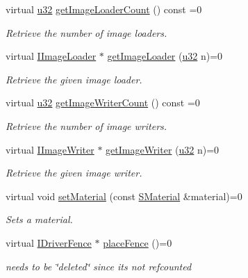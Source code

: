 \begin{DoxyCompactItemize}
\item 
virtual \hyperlink{namespaceirr_a0416a53257075833e7002efd0a18e804}{u32} \hyperlink{classirr_1_1video_1_1IVideoDriver_a672575822cce8b590b6ed709f08cdaac}{get\+Image\+Loader\+Count} () const  =0
\begin{DoxyCompactList}\small\item\em Retrieve the number of image loaders. \end{DoxyCompactList}\item 
virtual \hyperlink{classirr_1_1video_1_1IImageLoader}{I\+Image\+Loader} $\ast$ \hyperlink{classirr_1_1video_1_1IVideoDriver_a5cc08e7cd2ce2a30275e22ce13bb1013}{get\+Image\+Loader} (\hyperlink{namespaceirr_a0416a53257075833e7002efd0a18e804}{u32} n)=0
\begin{DoxyCompactList}\small\item\em Retrieve the given image loader. \end{DoxyCompactList}\item 
virtual \hyperlink{namespaceirr_a0416a53257075833e7002efd0a18e804}{u32} \hyperlink{classirr_1_1video_1_1IVideoDriver_ab8765c883399c84fca2165309e19d65e}{get\+Image\+Writer\+Count} () const  =0
\begin{DoxyCompactList}\small\item\em Retrieve the number of image writers. \end{DoxyCompactList}\item 
virtual \hyperlink{classirr_1_1video_1_1IImageWriter}{I\+Image\+Writer} $\ast$ \hyperlink{classirr_1_1video_1_1IVideoDriver_acdc5e788993c117efebb22e155ab6a77}{get\+Image\+Writer} (\hyperlink{namespaceirr_a0416a53257075833e7002efd0a18e804}{u32} n)=0
\begin{DoxyCompactList}\small\item\em Retrieve the given image writer. \end{DoxyCompactList}\item 
virtual void \hyperlink{classirr_1_1video_1_1IVideoDriver_a8c9e31b41b7e6fd26cf65ce538ebab05}{set\+Material} (const \hyperlink{classirr_1_1video_1_1SMaterial}{S\+Material} \&material)=0
\begin{DoxyCompactList}\small\item\em Sets a material. \end{DoxyCompactList}\item 
virtual \hyperlink{classirr_1_1video_1_1IDriverFence}{I\+Driver\+Fence} $\ast$ \hyperlink{classirr_1_1video_1_1IVideoDriver_aafdf5e755656fdd9f35d8ff8314db439}{place\+Fence} ()=0
\begin{DoxyCompactList}\small\item\em needs to be \char`\"{}deleted\char`\"{} since its not refcounted \end{DoxyCompactList}\item 

\end{DoxyCompactItemize}
